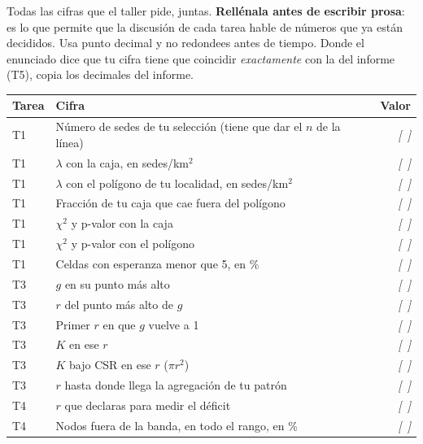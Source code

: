 \documentclass[11pt,a4paper,oneside]{article}
\newcommand{\marcador}[1]{\textcolor{grismarcador}{\textit{[#1]}}}
\begin{document}
Todas las cifras que el taller pide, juntas. \textbf{Rellénala antes de escribir prosa}: es lo que
permite que la discusión de cada tarea hable de números que ya están decididos. Usa punto decimal
y no redondees antes de tiempo. Donde el enunciado dice que tu cifra tiene que coincidir
\emph{exactamente} con la del informe (T5), copia los decimales del informe.

\vspace{0.3cm}
\renewcommand{\arraystretch}{1.25}
\begingroup\setlength{\parskip}{0pt}
\begin{tabularx}{\textwidth}{@{}l X r@{}}
\toprule
\textbf{Tarea} & \textbf{Cifra} & \textbf{Valor} \\
\midrule
T1 & Número de sedes de tu selección (tiene que dar el $n$ de la línea) & \marcador{~} \\
T1 & $\lambda$ con la caja, en sedes/km$^2$                               & \marcador{~} \\
T1 & $\lambda$ con el polígono de tu localidad, en sedes/km$^2$           & \marcador{~} \\
T1 & Fracción de tu caja que cae fuera del polígono                       & \marcador{~} \\
T1 & $\chi^2$ y p-valor con la caja                                       & \marcador{~} \\
T1 & $\chi^2$ y p-valor con el polígono                                   & \marcador{~} \\
T1 & Celdas con esperanza menor que 5, en \%                              & \marcador{~} \\
\midrule
T3 & $g$ en su punto más alto                                             & \marcador{~} \\
T3 & $r$ del punto más alto de $g$                                        & \marcador{~} \\
T3 & Primer $r$ en que $g$ vuelve a 1                                     & \marcador{~} \\
T3 & $K$ en ese $r$                                                       & \marcador{~} \\
T3 & $K$ bajo CSR en ese $r$ ($\pi r^2$)                                  & \marcador{~} \\
T3 & $r$ hasta donde llega la agregación de tu patrón                     & \marcador{~} \\
\midrule
T4 & $r$ que declaras para medir el déficit                               & \marcador{~} \\
T4 & Nodos fuera de la banda, en todo el rango, en \%                     & \marcador{~} \\

\end{tabularx}
\end{document}
